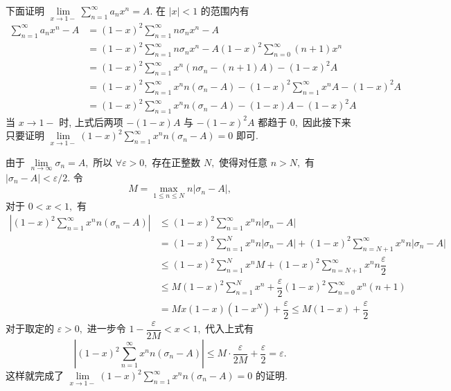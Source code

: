 \begin{solution}
\begin{enumerate}
下面证明 $\lim\limits_{x \to 1-} \sum\limits_{n=1}^{\infty} a_n x^n = A.$ 在 $\lvert x \rvert < 1$ 的范围内有
\begin{align*}
\sum\limits_{n=1}^{\infty} a_n x^n - A & = (1-x)^2 \sum\limits_{n=1}^{\infty} n\sigma_n x^n - A \\
& = (1-x)^2 \sum\limits_{n=1}^{\infty} n\sigma_n x^n - A (1-x)^2 \sum\limits_{n=0}^\infty (n+1) x^n \\
& = (1-x)^2 \sum\limits_{n=1}^\infty x^n (n \sigma_n - (n+1)A) - (1-x)^2 A \\
& = (1-x)^2 \sum\limits_{n=1}^\infty x^n n (\sigma_n - A) - (1-x)^2 \sum\limits_{n=1}^\infty x^n A - (1-x)^2 A \\
& = (1-x)^2 \sum\limits_{n=1}^\infty x^n n (\sigma_n - A) - (1 - x) A - (1-x)^2 A
\end{align*}
当 $x \to 1-$ 时, 上式后两项 $-(1 - x) A$ 与 $-(1-x)^2 A$ 都趋于 $0,$ 因此接下来只要证明 $\lim\limits_{x \to 1-} (1-x)^2 \sum\limits_{n=1}^\infty x^n n (\sigma_n - A) = 0$ 即可.

由于 $\lim\limits_{n\to\infty} \sigma_n = A,$ 所以 $\forall \varepsilon > 0,$ 存在正整数 $N,$ 使得对任意 $n > N,$ 有 $\lvert \sigma_n - A \rvert < \varepsilon / 2.$ 令
\[M = \max\limits_{1\leqslant n \leqslant N} n \lvert \sigma_n - A \rvert,\]
对于 $0 < x < 1,$ 有
\begin{align*}
\left\lvert (1-x)^2 \sum\limits_{n=1}^\infty x^n n (\sigma_n - A) \right\rvert & \leqslant (1-x)^2 \sum\limits_{n=1}^\infty x^n n \lvert \sigma_n - A \rvert \\
& = (1-x)^2 \sum\limits_{n=1}^N x^n n \lvert \sigma_n - A \rvert + (1-x)^2 \sum\limits_{n=N+1}^\infty x^n n \lvert \sigma_n - A \rvert \\
& \leqslant (1-x)^2 \sum\limits_{n=1}^N x^n M + (1-x)^2 \sum\limits_{n=N+1}^\infty x^n n \dfrac{\varepsilon}{2} \\
& \leqslant M (1-x)^2 \sum\limits_{n=1}^N x^n + \dfrac{\varepsilon}{2} (1-x)^2 \sum\limits_{n=0}^\infty x^n (n + 1) \\
& = M x (1 - x) (1 - x^N) + \dfrac{\varepsilon}{2} \leqslant M (1 - x) + \dfrac{\varepsilon}{2}
\end{align*}
对于取定的 $\varepsilon > 0,$ 进一步令 $1 - \dfrac{\varepsilon}{2M} < x < 1,$ 代入上式有
\[\left\lvert (1-x)^2 \sum\limits_{n=1}^\infty x^n n (\sigma_n - A) \right\rvert \leqslant M \cdot \dfrac{\varepsilon}{2M} + \dfrac{\varepsilon}{2} = \varepsilon.\]
这样就完成了 $\lim\limits_{x \to 1-} (1-x)^2 \sum\limits_{n=1}^\infty x^n n (\sigma_n - A) = 0$ 的证明.
\end{enumerate}
\end{solution}


